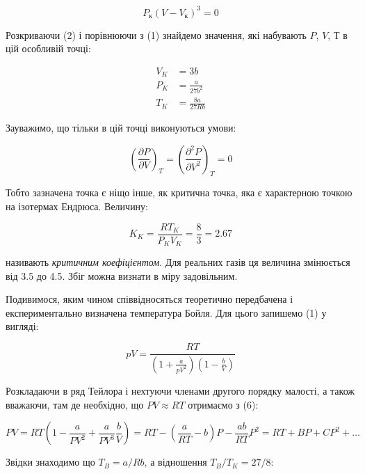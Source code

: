 \documentclass{article}
\begin{document}
\begin{equation}
P_{к}(V - V_{к})^{3} = 0
\label{eq:93.2}
\end{equation}

Розкриваючи (2) і порівнюючи з (1) знайдемо значення, які набувають $P$, $V$, $Т$ в цій особливій
точці:

\begin{align}
V_{K} &= 3b \label{eq:93.3} \\
P_{K} &= \frac{a}{27b^{2}} \label{eq:93.4} \\
T_{K} &= \frac{8a}{27Rb} \label{eq:93.5}
\end{align}

Зауважимо, що тільки в цій точці виконуються умови:

\begin{equation}
\left( \frac{\partial P}{\partial V} \right)_{T} = \left( \frac{\partial^{2}P}{\partial V^{2}}
\right)_{T} = 0
\label{eq:93.6}
\end{equation}

Тобто зазначена точка є ніщо інше, як критична точка, яка є характерною точкою на ізотермах Ендрюса.
Величину:

\begin{equation}
K_{K} = \frac{RT_{K}}{P_{K}V_{K}} = \frac{8}{3} = 2.67
\label{eq:93.7}
\end{equation}

називають \emph{критичним коефіцієнтом}. Для реальних газів ця величина змінюється від 3.5 до 4.5.
Збіг можна визнати в міру задовільним.

Подивимося, яким чином співвідносяться теоретично передбачена і експериментально визначена температура
Бойля. Для цього запишемо (1) у вигляді:

\begin{equation}
pV = \frac{RT}{(1 + \frac{a}{pV^{2}})(1 - \frac{b}{V})}
\label{eq:93.8}
\end{equation}

Розкладаючи в ряд Тейлора і нехтуючи членами другого порядку малості, а також вважаючи, там де
необхідно, що $PV \approx RT$ отримаємо з (6):

\begin{equation}
PV = RT\left( 1 - \frac{a}{PV^{2}} + \frac{a}{PV^{3}}\frac{b}{V} \right) = RT - \left( \frac{a}{RT} -
b \right)P - \frac{ab}{RT}P^{2} = RT + BP + CP^{2} + \ldots
\label{eq:93.9}
\end{equation}

Звідки знаходимо що $T_{B} = a / Rb$, а відношення $T_{B} / T_{K} = 27/8$:
\end{document}
